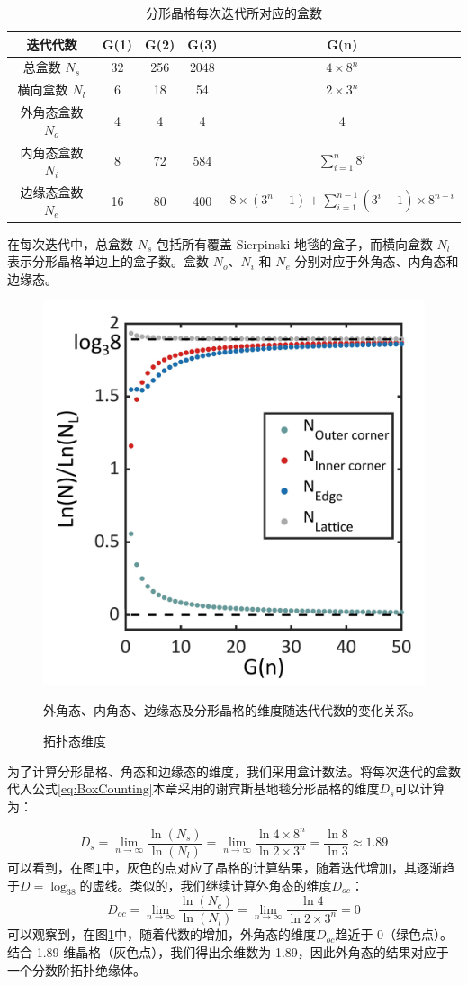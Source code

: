 \begin{table}[htbp]
    \centering
    \begin{tabular}{|c|c|c|c|c|}
        \hline
        迭代代数 & G(1) & G(2) & G(3) & G(n) \\
        \hline
        总盒数 \(N_s\) & 32 & 256 & 2048 & \(4 \times 8^n\) \\
        \hline
        横向盒数 \(N_l\) & 6 & 18 & 54 & \(2 \times 3^n\) \\
        \hline
        外角态盒数 \(N_o\) & 4 & 4 & 4 & 4 \\
        \hline
        内角态盒数 \(N_i\) & 8 & 72 & 584 & \(\sum_{i=1}^{n} 8^i\) \\
        \hline
        边缘态盒数 \(N_e\) & 16 & 80 & 400 & \(8 \times (3^n - 1) + \sum_{i=1}^{n-1} (3^i - 1) \times 8^{n-i}\) \\
        \hline
    \end{tabular}
    \caption{分形晶格每次迭代所对应的盒数}在每次迭代中，总盒数 \( N_s \) 包括所有覆盖 Sierpinski 地毯的盒子，而横向盒数 \( N_l \) 表示分形晶格单边上的盒子数。盒数 \( N_o \)、\( N_i \) 和 \( N_e \) 分别对应于外角态、内角态和边缘态。
\label{tab:Generation}
\end{table}

\begin{figure}[htbp]
    \centering
    \includegraphics[width=0.5\linewidth]{figure/HOTITheo/Dimension.png}
    \caption{拓扑态维度}外角态、内角态、边缘态及分形晶格的维度随迭代代数的变化关系。
    \label{fig:Dimension}
\end{figure}

为了计算分形晶格、角态和边缘态的维度，我们采用盒计数法。将每次迭代的盒数代入公式\ref{eq:BoxCounting}本章采用的谢宾斯基地毯分形晶格的维度$D_s$可以计算为：

\begin{equation}
D_s = \lim_{n \to \infty} \frac{\ln (N_s)}{\ln (N_l)} = \lim_{n \to \infty} \frac{\ln 4 \times 8^n}{\ln 2 \times 3^n} = \frac{\ln 8}{\ln 3} \approx 1.89
\end{equation}
可以看到，在图\ref{fig:Dimension}中，灰色的点对应了晶格的计算结果，随着迭代增加，其逐渐趋于$D=\log_38$的虚线。类似的，我们继续计算外角态的维度$D_{oc}$：
\begin{equation}
D_{oc} = \lim_{n \to \infty} \frac{\ln (N_c)}{\ln (N_l)} = \lim_{n \to \infty} \frac{\ln 4}{\ln 2 \times 3^n} = 0
\end{equation}
可以观察到，在图\ref{fig:Dimension}中，随着代数的增加，外角态的维度$D_{oc}$趋近于 0（绿色点）。结合 1.89 维晶格（灰色点），我们得出余维数为 1.89，因此外角态的结果对应于一个分数阶拓扑绝缘体。

